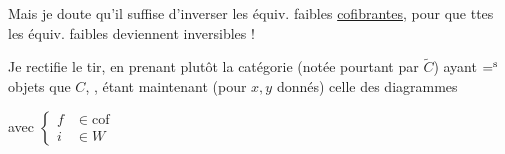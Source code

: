 Mais je doute qu'il suffise d'inverser les équiv. faibles \uline{cofibrantes}, pour que ttes les équiv. faibles deviennent inversibles !

Je rectifie  le tir, en prenant plutôt la catégorie (notée pourtant par $\widetilde C$) ayant $\mathord{=}^{\rm s}$ objets que $C$,  ,   étant maintenant (pour $x,y$ donnés)  celle des diagrammes 


avec $\left\{\begin{aligned} f&\in\mathrm{cof}\\ i&\in W\end{aligned}\right.$


